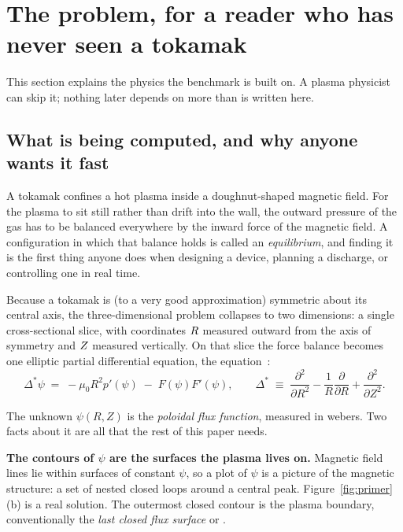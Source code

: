 \section{The problem, for a reader who has never seen a tokamak}
\label{sec:physics}

This section explains the physics the benchmark is built on. A plasma physicist
can skip it; nothing later depends on more than is written here.

\subsection{What is being computed, and why anyone wants it fast}

A tokamak confines a hot plasma inside a doughnut-shaped magnetic field. For
the plasma to sit still rather than drift into the wall, the outward pressure of
the gas has to be balanced everywhere by the inward force of the magnetic field.
A configuration in which that balance holds is called an \emph{equilibrium}, and
finding it is the first thing anyone does when designing a device, planning a
discharge, or controlling one in real time.

Because a tokamak is (to a very good approximation) symmetric about its central
axis, the three-dimensional problem collapses to two dimensions: a single
cross-sectional slice, with coordinates $R$ measured outward from the axis
of symmetry and $Z$ measured vertically. On that slice the force balance
becomes one elliptic partial differential equation, the \GS{}
equation~\citep{grad1958hydromagnetic,shafranov1958magnetohydrodynamical}:
\begin{equation}
  \Delta^{*}\psi \;=\; -\mu_{0}R^{2}p'(\psi) \;-\; F(\psi)F'(\psi),
  \qquad
  \Delta^{*} \;\equiv\;
  \frac{\partial^{2}}{\partial R^{2}}
  - \frac{1}{R}\frac{\partial}{\partial R}
  + \frac{\partial^{2}}{\partial Z^{2}} .
  \label{eq:gs}
\end{equation}

The unknown $\psi(R,Z)$ is the \emph{poloidal flux function}, measured in
webers. Two facts about it are all that the rest of this paper needs.

\textbf{The contours of $\psi$ are the surfaces the plasma lives on.} Magnetic
field lines lie within surfaces of constant $\psi$, so a plot of $\psi$ is a
picture of the magnetic structure: a set of nested closed loops around a central
peak. Figure~\ref{fig:primer}(b) is a real solution. The outermost closed
contour is the plasma boundary, conventionally the \emph{last closed flux
surface} or \lcfs{}.

